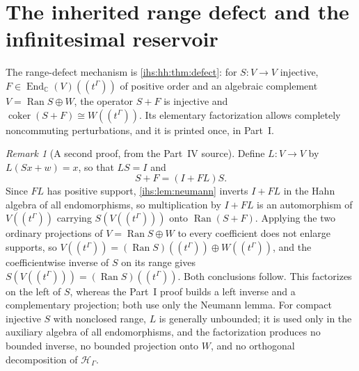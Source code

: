 \documentclass[11pt,a4paper]{article}
\numberwithin{equation}{section}
\theoremstyle{definition}
\theoremstyle{remark}
\newtheorem{remark}[remark]{Remark}
\newcommand{\C}{\mathbb C}
\newcommand{\Hil}{\mathcal H_\Gamma}
\newcommand{\Ran}{\operatorname{Ran}}
\newcommand{\End}{\operatorname{End}}
\newcommand{\coker}{\operatorname{coker}}
\begin{document}
\section{The inherited range defect and the infinitesimal reservoir}\label{ihs:fr:sec:defect}

The range-defect mechanism is \cref{ihs:hh:thm:defect}: for $S:V\to V$
injective, $F\in\End_\C(V)((t^\Gamma))$ of positive order and an algebraic
complement $V=\Ran S\oplus W$, the operator $S+F$ is injective and
$\coker(S+F)\cong W((t^\Gamma))$. Its elementary factorization allows
completely noncommuting perturbations, and it is printed once, in Part~I.

\begin{remark}[A second proof, from the Part~IV source]\label{ihs:fr:rem:secondproof}
Define $L:V\to V$ by $L(Sx+w)=x$, so that $LS=I$ and
\[
 S+F=(I+FL)S.
\]
Since $FL$ has positive support, \cref{ihs:lem:neumann} inverts $I+FL$ in
the Hahn algebra of all endomorphisms, so multiplication by $I+FL$ is an
automorphism of $V((t^\Gamma))$ carrying $S(V((t^\Gamma)))$ onto
$\Ran(S+F)$. Applying the two ordinary projections of $V=\Ran S\oplus W$ to
every coefficient does not enlarge supports, so
$V((t^\Gamma))=(\Ran S)((t^\Gamma))\oplus W((t^\Gamma))$, and the
coefficientwise inverse of $S$ on its range gives
$S(V((t^\Gamma)))=(\Ran S)((t^\Gamma))$. Both conclusions follow. This
factorizes on the left of $S$, whereas the Part~I proof builds a left
inverse and a complementary projection; both use only the Neumann lemma. For
compact injective $S$ with nonclosed range, $L$ is generally unbounded; it is
used only in the auxiliary algebra of all endomorphisms, and the
factorization produces no bounded inverse, no bounded projection onto $W$,
and no orthogonal decomposition of $\Hil$.
\end{remark}
\end{document}
